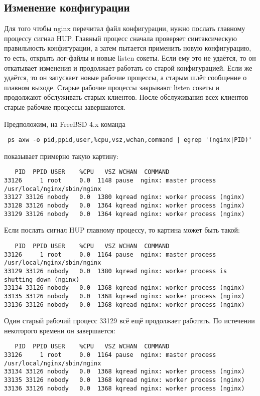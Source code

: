 \documentclass[a4paper,10pt,twoside]{article}
\begin{document}
\subsection{Изменение конфигурации}
Для того чтобы nginx перечитал файл конфигурации, нужно послать главному процессу сигнал HUP. Главный процесс сначала проверяет синтаксическую правильность конфигурации, а затем пытается применить новую конфигурацию, то есть, открыть лог-файлы и новые listen сокеты. Если ему это не удаётся, то он откатывает изменения и продолжает работать со старой конфигурацией. Если же удаётся, то он запускает новые рабочие процессы, а старым шлёт сообщение о плавном выходе. Старые рабочие процессы закрывают listen сокеты и продолжают обслуживать старых клиентов. После обслуживания всех клиентов старые рабочие процессы завершаются.

Предположим, на FreeBSD 4.x команда

\begin{verbatim}
 ps axw -o pid,ppid,user,%cpu,vsz,wchan,command | egrep '(nginx|PID)'
\end{verbatim} 
показывает примерно такую картину:

\begin{verbatim}
   PID  PPID USER    %CPU   VSZ WCHAN  COMMAND
33126     1 root     0.0  1148 pause  nginx: master process /usr/local/nginx/sbin/nginx
33127 33126 nobody   0.0  1380 kqread nginx: worker process (nginx)
33128 33126 nobody   0.0  1364 kqread nginx: worker process (nginx)
33129 33126 nobody   0.0  1364 kqread nginx: worker process (nginx)
\end{verbatim} 
Если послать сигнал HUP главному процессу, то картина может быть такой:

\begin{verbatim}
   PID  PPID USER    %CPU   VSZ WCHAN  COMMAND
33126     1 root     0.0  1164 pause  nginx: master process /usr/local/nginx/sbin/nginx
33129 33126 nobody   0.0  1380 kqread nginx: worker process is shutting down (nginx)
33134 33126 nobody   0.0  1368 kqread nginx: worker process (nginx)
33135 33126 nobody   0.0  1368 kqread nginx: worker process (nginx)
33136 33126 nobody   0.0  1368 kqread nginx: worker process (nginx)
\end{verbatim} 
Один старый рабочий процесс 33129 всё ещё продолжает работать. По истечении некоторого времени он завершается:

\begin{verbatim}
   PID  PPID USER    %CPU   VSZ WCHAN  COMMAND
33126     1 root     0.0  1164 pause  nginx: master process /usr/local/nginx/sbin/nginx
33134 33126 nobody   0.0  1368 kqread nginx: worker process (nginx)
33135 33126 nobody   0.0  1368 kqread nginx: worker process (nginx)
33136 33126 nobody   0.0  1368 kqread nginx: worker process (nginx)
\end{verbatim} 
\end{document}
